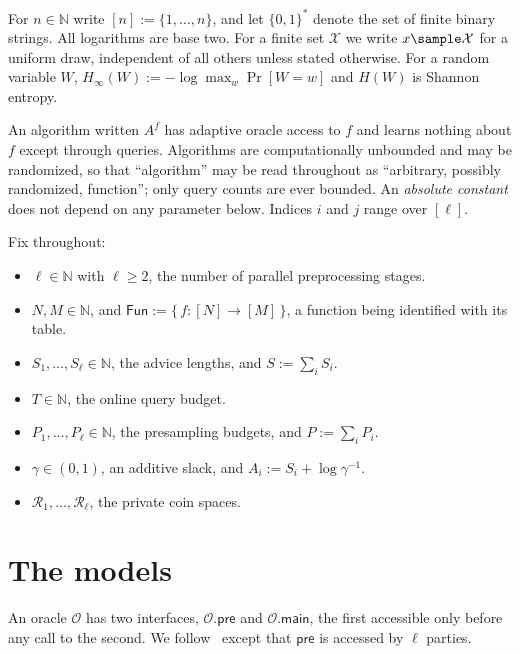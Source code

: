 \documentclass{conjura-conjecture}
\newcommand{\Fun}{\mathsf{Fun}}
\newcommand{\Prob}[1]{\Pr\!\left[#1\right]}
\newcommand{\bits}{\{0,1\}}
\newcommand{\pre}{\mathsf{pre}}
\newcommand{\main}{\mathsf{main}}
\newcommand{\Hmin}{H_{\infty}}
\begin{document}
For $n \in \mathbb{N}$ write $[n] := \{1,\dots,n\}$, and let $\bits^{*}$
denote the set of finite binary strings. All logarithms are base two. For
a finite set $\mathcal{X}$ we write $x \sample \mathcal{X}$ for a uniform
draw, independent of all others unless stated otherwise. For a random
variable $W$, $\Hmin(W) := -\log\max_w \Prob{W = w}$ and $H(W)$ is Shannon
entropy.

An algorithm written $A^{f}$ has adaptive oracle access to $f$ and learns
nothing about $f$ except through queries. Algorithms are computationally
unbounded and may be randomized, so that ``algorithm'' may be read
throughout as ``arbitrary, possibly randomized, function''; only query
counts are ever bounded. An \emph{absolute constant} does not depend on
any parameter below. Indices $i$ and $j$ range over $[\ell]$.

Fix throughout:
\begin{itemize}
\item $\ell \in \mathbb{N}$ with $\ell \ge 2$, the number of parallel
  preprocessing stages.
\item $N, M \in \mathbb{N}$, and $\Fun := \{\, f : [N] \to [M] \,\}$, a
  function being identified with its table.
\item $S_1,\dots,S_\ell \in \mathbb{N}$, the advice lengths, and
  $S := \sum_i S_i$.
\item $T \in \mathbb{N}$, the online query budget.
\item $P_1,\dots,P_\ell \in \mathbb{N}$, the presampling budgets, and
  $P := \sum_i P_i$.
\item $\gamma \in (0,1)$, an additive slack, and
  $A_i := S_i + \log\gamma^{-1}$.
\item $\mathcal{R}_1,\dots,\mathcal{R}_\ell$, the private coin spaces.
\end{itemize}

\section{The models}\label{sec:models}

An oracle $\mathcal{O}$ has two interfaces, $\mathcal{O}.\pre$ and
$\mathcal{O}.\main$, the first accessible only before any call to the
second. We follow~\cite[\S2.2.1]{CDGS} except that $\pre$ is accessed by
$\ell$ parties.
\end{document}
